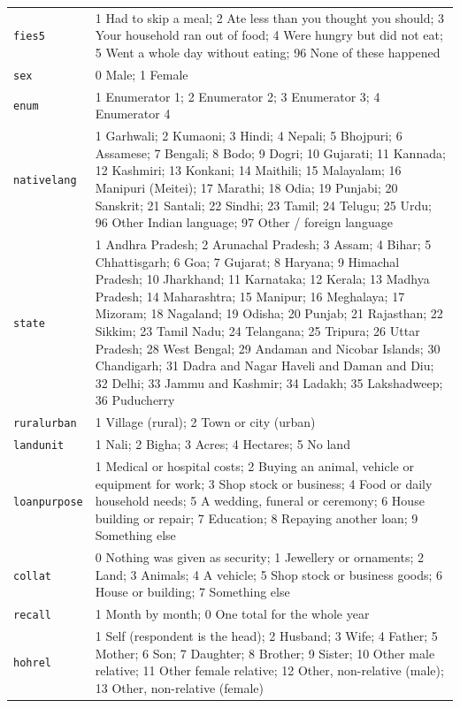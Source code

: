 \documentclass[10pt]{article}
\begin{document}
{\begin{longtable}{p{2cm}p{14cm}}
\texttt{fies5} & 1 Had to skip a meal; 2 Ate less than you thought you should; 3 Your household ran out of food; 4 Were hungry but did not eat; 5 Went a whole day without eating; 96 None of these happened \\
\texttt{sex} & 0 Male; 1 Female \\
\texttt{enum} & 1 Enumerator 1; 2 Enumerator 2; 3 Enumerator 3; 4 Enumerator 4 \\
\texttt{nativelang} & 1 Garhwali; 2 Kumaoni; 3 Hindi; 4 Nepali; 5 Bhojpuri; 6 Assamese; 7 Bengali; 8 Bodo; 9 Dogri; 10 Gujarati; 11 Kannada; 12 Kashmiri; 13 Konkani; 14 Maithili; 15 Malayalam; 16 Manipuri (Meitei); 17 Marathi; 18 Odia; 19 Punjabi; 20 Sanskrit; 21 Santali; 22 Sindhi; 23 Tamil; 24 Telugu; 25 Urdu; 96 Other Indian language; 97 Other / foreign language \\
\texttt{state} & 1 Andhra Pradesh; 2 Arunachal Pradesh; 3 Assam; 4 Bihar; 5 Chhattisgarh; 6 Goa; 7 Gujarat; 8 Haryana; 9 Himachal Pradesh; 10 Jharkhand; 11 Karnataka; 12 Kerala; 13 Madhya Pradesh; 14 Maharashtra; 15 Manipur; 16 Meghalaya; 17 Mizoram; 18 Nagaland; 19 Odisha; 20 Punjab; 21 Rajasthan; 22 Sikkim; 23 Tamil Nadu; 24 Telangana; 25 Tripura; 26 Uttar Pradesh; 28 West Bengal; 29 Andaman and Nicobar Islands; 30 Chandigarh; 31 Dadra and Nagar Haveli and Daman and Diu; 32 Delhi; 33 Jammu and Kashmir; 34 Ladakh; 35 Lakshadweep; 36 Puducherry \\
\texttt{ruralurban} & 1 Village (rural); 2 Town or city (urban) \\
\texttt{landunit} & 1 Nali; 2 Bigha; 3 Acres; 4 Hectares; 5 No land \\
\texttt{loanpurpose} & 1 Medical or hospital costs; 2 Buying an animal, vehicle or equipment for work; 3 Shop stock or business; 4 Food or daily household needs; 5 A wedding, funeral or ceremony; 6 House building or repair; 7 Education; 8 Repaying another loan; 9 Something else \\
\texttt{collat} & 0 Nothing was given as security; 1 Jewellery or ornaments; 2 Land; 3 Animals; 4 A vehicle; 5 Shop stock or business goods; 6 House or building; 7 Something else \\
\texttt{recall} & 1 Month by month; 0 One total for the whole year \\
\texttt{hohrel} & 1 Self (respondent is the head); 2 Husband; 3 Wife; 4 Father; 5 Mother; 6 Son; 7 Daughter; 8 Brother; 9 Sister; 10 Other male relative; 11 Other female relative; 12 Other, non-relative (male); 13 Other, non-relative (female) \\

\end{longtable}}
\end{document}
